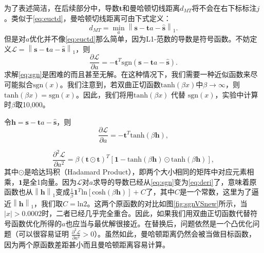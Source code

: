 为了表述简洁，在后续部分中，导数$\mathbf{t}$和曼哈顿切线距离$d_{MT}$将不会在右下标标注$j$。类似于\eqref{eq:euctd}，曼哈顿切线距离可由下式定义：
\begin{equation}
d_{MT} = \mathop {\min }\limits_{a} {\left\| \mathbf{s} - \mathbf{t}a - \widehat{\mathbf{s}} \right\|}_1. \label{eq:mantd}
\end{equation}
但是对$a$优化并不像\eqref{eq:euctd}那么简单，因为L1-范数的导数是符号函数。不妨定义$\mathcal{L} = {\left\| \mathbf{s} - \mathbf{t}a - \widehat{\mathbf{s}} \right\|}_1$，则
\begin{equation}
\frac{\partial \mathcal{L}}{\partial a} = -\mathbf{t}^T \mathrm{sgn}\left( \mathbf{s} - \mathbf{t}a - \widehat{\mathbf{s}} \right). \label{eq:sgn}
\end{equation}
求解\eqref{eq:sgn}是困难的而且甚至无解。在这种情况下，我们需要一种近似函数来尽可能拟合$\mathrm{sgn}(x)$。我们注意到，若双曲正切函数$\mathrm{tanh}(\beta x)$中$\beta \rightarrow \infty$，则$\mathrm{tanh}(\beta x) = \mathrm{sgn}(x)$。因此，我们将用$\mathrm{tanh}(\beta x)$ 代替 $\mathrm{sgn}(x)$，实验中计算时$\beta$取10,000。

令$\mathbf{h} = \mathbf{s} - \mathbf{t}a - \widehat{\mathbf{s}}$，则
\begin{equation}
\frac{\partial \mathcal{L}}{\partial a} = -\mathbf{t}^T \mathrm{tanh}\left( \beta \mathbf{h} \right), \label{eq:deri}
\end{equation}

\begin{equation}
\frac{{\partial}^2 \mathcal{L}}{\partial a^2} = \beta \left( \mathbf{t} \odot \mathbf{t} \right )^T \left[ \mathbf{1} - \mathrm{tanh}\left( \beta \mathbf{h} \right) \odot \mathrm{tanh}\left( \beta \mathbf{h} \right) \right], \label{hessian}
\end{equation}
其中$\odot$是哈达玛积（Hadamard Product），即两个大小相同的矩阵中对应元素相乘，$\mathbf{1}$是全1向量。因为$\mathcal{L}$对$a$求导的导数已经从\eqref{eq:sgn}变为\eqref{eq:deri}了，意味着原函数也从${\left\| \mathbf{h} \right\|}_1$变成$\frac{1}{\beta}\mathbf{1}^T\mathrm{ln}\left[ \mathrm{cosh} \left( \beta \mathbf{h} \right) \right] + C$了，其中$C$是一个常数，这里为了逼近${\left\| \mathbf{h} \right\|}_1$，我们取$C=\mathrm{ln}2$。这两个原函数的对比如图\ref{fig:sgnVSnew}所示，当$|x|>0.0002$时，二者已经几乎完全重合。因此，如果我们用双曲正切函数代替符号函数优化所得的$a$也应当与最优解很接近。在替换后，问题依然是一个凸优化问题（可以很容易证明 $\frac{{\partial}^2 \mathcal{L}}{\partial a^2} > 0$）。虽然如此，曼哈顿距离仍然会被当做目标函数，因为两个原函数差距甚小而且曼哈顿距离容易计算。

